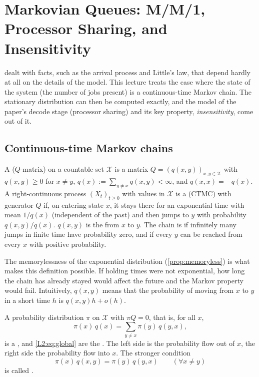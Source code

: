 \chapter{Markovian Queues: M/M/1, Processor Sharing, and Insensitivity}\label{sec:L2}

 dealt with facts, such as the arrival process and Little's law, that
depend hardly at all on the details of the model. This lecture treats the case where
the state of the system (the number of jobs present) is a continuous-time Markov
chain. The stationary distribution can then be computed exactly, and the model of the
paper's decode stage (processor sharing) and its key property, \emph{insensitivity},
come out of it.

\section{Continuous-time Markov chains}

\begin{definition}\label{def:ctmc}
A  ($Q$-matrix) on a countable set $\mathcal{X}$ is a matrix
$Q=(q(x,y))_{x,y\in\mathcal{X}}$ with $q(x,y)\ge 0$ for $x\ne y$,
$q(x):=\sum_{y\ne x}q(x,y)<\infty$, and $q(x,x)=-q(x)$.
A right-continuous process $(X_t)_{t\ge0}$ with values in $\mathcal{X}$ is a
 (CTMC) with generator $Q$ if, on entering state
$x$, it stays there for an exponential time with mean $1/q(x)$ (independent of the
past) and then jumps to $y$ with probability $q(x,y)/q(x)$. $q(x,y)$ is the
 from $x$ to $y$.
The chain is  if infinitely many jumps in finite time have
probability zero, and  if every $y$ can be reached from every $x$
with positive probability.
\end{definition}

The memorylessness of the exponential distribution (\cref{prop:memoryless}) is what
makes this definition possible. If holding times were not exponential, how long the
chain has already stayed would affect the future and the Markov property would fail.
Intuitively, $q(x,y)$ means that the probability of moving from $x$ to $y$ in a short
time $h$ is $q(x,y)h+o(h)$.

\begin{definition}\label{L2:def:balance}
A probability distribution $\pi$ on $\mathcal{X}$ with $\pi Q=0$, that is, for all $x$,
\begin{equation}\label{L2:eq:global}
  \pi(x)\,q(x)=\sum_{y\ne x}\pi(y)\,q(y,x),
\end{equation}
is a , and \eqref{L2:eq:global} are the
. The left side is the probability flow out of $x$,
the right side the probability flow into $x$. The stronger condition
\begin{equation}\label{L2:eq:detailed}
  \pi(x)\,q(x,y)=\pi(y)\,q(y,x)\qquad(\forall x\ne y)
\end{equation}
is called .
\end{definition}

